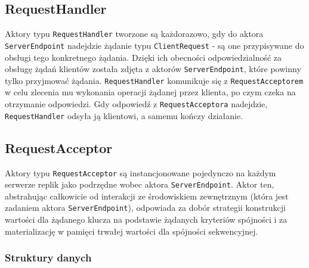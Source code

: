 \subsection{RequestHandler}

Aktory typu \texttt{RequestHandler} tworzone są każdorazowo, gdy do aktora \texttt{ServerEndpoint} nadejdzie żądanie typu \texttt{ClientRequest} - są one przypisywane do obsługi tego konkretnego żądania. Dzięki ich obecności odpowiedzialność za obsługę żądań klientów została zdjęta z aktorów \texttt{ServerEndpoint}, które powinny tylko przyjmować żądania. \texttt{RequestHandler} komunikuje się z \texttt{RequestAcceptorem} w celu zlecenia mu wykonania operacji żądanej przez klienta, po czym czeka na otrzymanie odpowiedzi. Gdy odpowiedź z \texttt{RequestAcceptora} nadejdzie, \texttt{RequestHandler} odsyła ją klientowi, a samemu kończy działanie.

\subsection{RequestAcceptor} \label{subsection:requestacceptor}

Aktory typu \texttt{RequestAcceptor} są instancjonowane pojedynczo na każdym serwerze replik jako podrzędne wobec aktora \texttt{ServerEndpoint}. Aktor ten, abstrahując całkowicie od interakcji ze środowiskiem zewnętrznym (która jest zadaniem aktora \texttt{ServerEndpoint}), odpowiada za dobór strategii konstrukcji wartości dla żądanego klucza na podstawie żądanych kryteriów spójności i za materializację w pamięci trwałej wartości dla spójności sekwencyjnej.

\subsubsection{Struktury danych} \label{subsubsection:datastructuresimpl}

